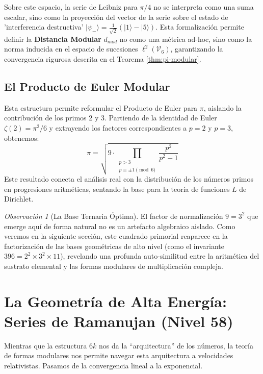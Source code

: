 \documentclass{article}
\theoremstyle{plain}
\theoremstyle{definition}
\theoremstyle{remark}
\newtheorem{remark}[theorem]{Observación}
\numberwithin{equation}{section}
\begin{document}
Sobre este espacio, la serie de Leibniz para $\pi/4$ no se interpreta como una suma escalar, sino como la proyección del vector de la serie sobre el estado de 'interferencia destructiva' $|\psi_-\rangle = \frac{1}{\sqrt{2}}(|1\rangle - |5\rangle)$.
Esta formalización permite definir la \textbf{Distancia Modular} $d_{mod}$ no como una métrica ad-hoc, sino como la norma inducida en el espacio de sucesiones $\ell^2(\mathcal{V}_6)$, garantizando la convergencia rigurosa descrita en el Teorema \ref{thm:pi-modular}.

\subsection{El Producto de Euler Modular}
Esta estructura permite reformular el Producto de Euler para $\pi$, aislando la contribución de los primos 2 y 3. Partiendo de la identidad de Euler $\zeta(2) = \pi^2/6$ y extrayendo los factores correspondientes a $p=2$ y $p=3$, obtenemos:
\begin{equation}
\pi = \sqrt{9 \cdot \prod_{\substack{p > 3 \\ p \equiv \pm 1 \pmod{6}}} \frac{p^2}{p^2 - 1}}
\end{equation}
Este resultado conecta el análisis real con la distribución de los números primos en progresiones aritméticas, sentando la base para la teoría de funciones $L$ de Dirichlet.

\begin{remark}[La Base Ternaria Óptima]
El factor de normalización $9 = 3^2$ que emerge aquí de forma natural no es un artefacto algebraico aislado. Como veremos en la siguiente sección, este cuadrado primorial reaparece en la factorización de las bases geométricas de alto nivel (como el invariante $396 = 2^2 \times 3^2 \times 11$), revelando una profunda auto-similitud entre la aritmética del sustrato elemental y las formas modulares de multiplicación compleja.
\end{remark}
\section{La Geometría de Alta Energía: Series de Ramanujan (Nivel 58)}

Mientras que la estructura $6k$ nos da la ``arquitectura'' de los números, la teoría de formas modulares nos permite navegar esta arquitectura a velocidades relativistas. Pasamos de la convergencia lineal a la exponencial.
\end{document}

